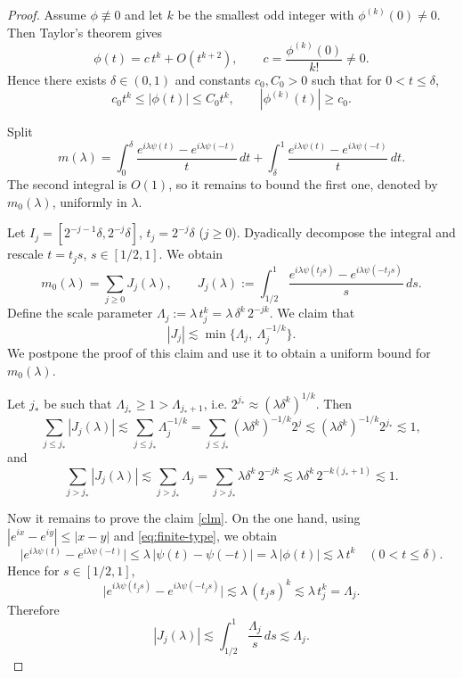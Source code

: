 \documentclass[10pt,a4paper]{amsart}
\newcommand{\la}{\lambda}
\newcommand{\ls}{\lesssim}
\begin{document}
\begin{proof}
	Assume $\phi\not\equiv 0$ and let $k$ be the smallest odd integer with $\phi^{(k)}(0)\neq 0$.
	Then Taylor's theorem gives
	\[
	\phi(t)=c\,t^k+O(t^{k+2}),\qquad c=\frac{\phi^{(k)}(0)}{k!}\neq 0.
	\]
	Hence there exists $\delta\in(0,1)$ and constants $c_0,C_0>0$ such that for $0<t\le\delta$,
	\begin{equation}\label{eq:finite-type}
		c_0 t^k\le |\phi(t)|\le C_0 t^k,
		\qquad
		|\phi^{(k)}(t)|\ge c_0.
	\end{equation}
	
	Split
	\[
	m(\lambda)=\int_0^\delta \frac{e^{i\lambda\psi(t)}-e^{i\lambda\psi(-t)}}{t}\,dt
	+\int_\delta^1 \frac{e^{i\lambda\psi(t)}-e^{i\lambda\psi(-t)}}{t}\,dt.
	\]
	The second integral is $O(1)$, so it remains to bound the first one, denoted by $m_0(\la)$, uniformly in $\lambda$.
	
	Let $I_j=[2^{-j-1}\delta,2^{-j}\delta]$, $t_j=2^{-j}\delta$ ($j\ge 0$). Dyadically decompose the integral and
	rescale $t=t_js$, $s\in[1/2,1]$. We obtain
	\[
	m_0(\lambda)=\sum_{j\ge 0} J_j(\lambda),
	\qquad
	J_j(\lambda):=\int_{1/2}^1 \frac{e^{i\lambda\psi(t_js)}-e^{i\lambda\psi(-t_js)}}{s}\,ds.
	\]
	Define the scale parameter $\Lambda_j:=\lambda\,t_j^k=\lambda\,\delta^k\,2^{-jk}.$
We claim that \begin{equation}\label{clm}
	|J_j|\ls \min \{\Lambda_j,\ \Lambda_j^{-1/k}\}.
\end{equation} We postpone the proof of this claim and use it to obtain a uniform bound for $m_0(\lambda)$.

 Let $j_*$ be such that $\Lambda_{j_*}\ge 1>\Lambda_{j_*+1}$, i.e.
$2^{j_*}\approx (\lambda\delta^k)^{1/k}$. Then 
\[
\sum_{j\le j_*}|J_j(\lambda)|
\lesssim \sum_{j\le j_*}\Lambda_j^{-1/k}
=\sum_{j\le j_*}(\lambda\delta^k)^{-1/k}2^{j}
\lesssim (\lambda\delta^k)^{-1/k}2^{j_*}
\lesssim 1,
\]
and
\[
\sum_{j> j_*}|J_j(\lambda)|
\lesssim \sum_{j>j_*}\Lambda_j
=\sum_{j>j_*}\lambda\delta^k\,2^{-jk}
\lesssim \lambda\delta^k\,2^{-k(j_*+1)}
\lesssim 1.
\]

Now it remains to prove the claim \eqref{clm}. On the one hand, using $|e^{ix}-e^{iy}|\le |x-y|$ and \eqref{eq:finite-type}, we obtain
	\[
	\big|e^{i\lambda\psi(t)}-e^{i\lambda\psi(-t)}\big|
	\le \la\,|\psi(t)-\psi(-t)|
	=\la\,|\phi(t)|
	\lesssim \la\,t^k \quad (0<t\le\delta).
	\]
 Hence for $s\in[1/2,1]$,
	\[
	\big|e^{i\lambda\psi(t_js)}-e^{i\lambda\psi(-t_js)}\big|
	\lesssim \la\,(t_js)^k\lesssim \la\,t_j^k=\Lambda_j.
	\]
	Therefore
	\begin{equation}\label{eq:small}
		|J_j(\lambda)|
		\ls \int_{1/2}^1 \frac{\Lambda_j}{s}\,ds
		\lesssim \Lambda_j.
	\end{equation}
	

\end{proof}
\end{document}
